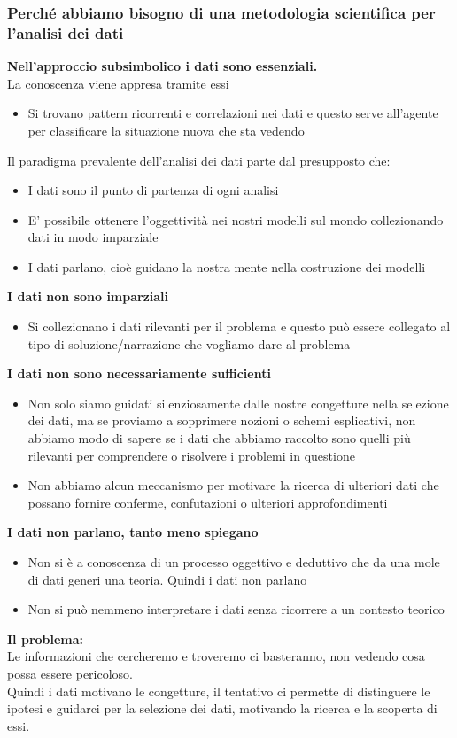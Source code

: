 \documentclass[../main.tex]{subfiles}
\begin{document}
	\subsubsection{Perché abbiamo bisogno di una metodologia scientifica per l’analisi dei dati}
	\textbf{Nell’approccio subsimbolico i dati sono essenziali.} \\
	La conoscenza viene appresa tramite essi
	\begin{itemize}
		\item Si trovano pattern ricorrenti e correlazioni nei dati e questo serve all'agente per classificare la situazione nuova che sta vedendo
	\end{itemize}
	Il paradigma prevalente dell’analisi dei dati parte dal presupposto che:
	\begin{itemize}
		\item I dati sono il punto di partenza di ogni analisi
		\item E’ possibile ottenere l’oggettività nei nostri modelli sul mondo collezionando dati in modo imparziale
		\item I dati parlano, cioè guidano la nostra mente nella costruzione dei modelli
	\end{itemize}
	\textbf{I dati non sono imparziali}
	\begin{itemize}
		\item Si collezionano i dati rilevanti per il problema e questo può essere collegato al tipo di soluzione/narrazione che vogliamo dare al problema
	\end{itemize}
	\textbf{I dati non sono necessariamente sufficienti}
	\begin{itemize}
		\item Non solo siamo guidati silenziosamente dalle nostre congetture nella selezione dei dati, ma se proviamo a sopprimere nozioni o schemi esplicativi, non abbiamo modo di sapere se i dati che abbiamo raccolto sono quelli più rilevanti per comprendere o risolvere i problemi in questione
		\item Non abbiamo alcun meccanismo per motivare la ricerca di ulteriori dati che possano fornire conferme, confutazioni o ulteriori approfondimenti
	\end{itemize}
	\textbf{I dati non parlano, tanto meno spiegano}
	\begin{itemize}
		\item Non si è a conoscenza di un processo oggettivo e deduttivo che da una mole di dati generi una teoria. Quindi i dati non parlano
		\item Non si può nemmeno interpretare i dati senza ricorrere a un contesto teorico
	\end{itemize}
	\textbf{Il problema:} \\
	Le informazioni che cercheremo e troveremo ci basteranno, non vedendo cosa possa essere pericoloso. \\
	Quindi i dati motivano le congetture, il tentativo ci permette di distinguere le ipotesi e guidarci per la selezione dei dati, motivando la ricerca e la scoperta di essi.
\end{document}
